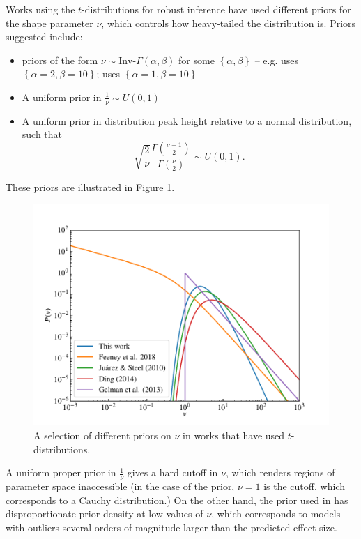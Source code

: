 \documentclass[fleqn,usenatbib]{mnras}
\begin{document}
Works using the $t$-distributions for robust inference have used different
priors for the shape parameter $\nu$, which controls how heavy-tailed the
distribution is. Priors suggested include:
\begin{itemize}
    \item priors of the form $\nu \sim \text{Inv-}\Gamma(\alpha, \beta)$ for
          some $\left\{\alpha, \beta\right\}$ -- e.g.
          \citet{Juarez:2010} uses $\left\{\alpha = 2, \beta = 10\right\}$;
          \citet{Ding:2014} uses $\left\{\alpha = 1, \beta = 10\right\}$
    \item A uniform prior in $\frac1\nu \sim U(0, 1)$ \citep{Gelman:2013}
    \item A uniform prior in distribution peak height relative to a normal
    distribution, such that
    \begin{equation}
        \sqrt{\frac2\nu}\frac{\Gamma\left(\frac{\nu + 1}{2}\right)}{\Gamma\left(\frac{\nu}{2}\right)} \sim U(0, 1).
    \end{equation}
\end{itemize}
These priors are illustrated in Figure \ref{fig:priors.pdf}.

\begin{figure}
	\includegraphics[width=\columnwidth]{graphics/pdf_nu}
    \caption{A selection of different priors on $\nu$ in works that have used
    $t$-distributions.}
    \label{fig:priors.pdf}
\end{figure}

A uniform proper prior in $\frac1\nu$ gives a hard cutoff in $\nu$, which
renders regions of parameter space inaccessible (in the case of the
\citet{Gelman:2013} prior, $\nu = 1$ is the cutoff, which corresponds to a
Cauchy distribution.) On the other hand, the prior used in \citet{Feeney:2018}
has disproportionate prior density at low values of $\nu$, which corresponds to
models with outliers several orders of magnitude larger than the predicted
effect size.
\end{document}
